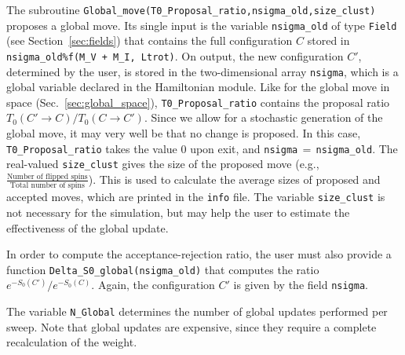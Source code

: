 The subroutine  \texttt{Global\_move(T0\_Proposal\_ratio,nsigma\_old,size\_clust)}  proposes  a global move. 
Its single input is the variable \texttt{nsigma\_old} of type \texttt{Field} (see Section~\ref{sec:fields}) that contains  the full  configuration $C$ stored in \texttt{nsigma\_old\%f(M\_V + M\_I, Ltrot)}.  On output, the new configuration $C'$, determined by the user,  is stored in the two-dimensional array \texttt{nsigma}, which is a global variable declared in the Hamiltonian module.
Like for the global move in space (Sec.~\ref{sec:global_space}), \texttt{T0\_Proposal\_ratio} contains the proposal ratio $T_0(C' \rightarrow C) / T_0(C \rightarrow C') $.
Since we allow for a stochastic  generation of  the global move, it may very well be that no change is proposed. In this case, \texttt{T0\_Proposal\_ratio}   takes the value 0 upon exit, and  \texttt{nsigma$\,=\,$nsigma\_old}.   
The real-valued \texttt{size\_clust} gives the size of the proposed move (e.g., $\tfrac{\text{Number of flipped spins}}{\text{Total number of spins}}$). This is used to calculate the average sizes of proposed and accepted moves, which are printed in the \texttt{info} file. The variable \texttt{size\_clust} is not necessary for the simulation, but may help the user to estimate the effectiveness of the global update.

In order to compute the acceptance-rejection ratio,  the user must also provide a function 
\texttt{Delta\_\-S0}\texttt{\_\-global(nsigma\_old)} that computes the ratio $e^{-S_0(C')}/e^{-S_0(C)}$. Again, the configuration $C'$ is given by the field \texttt{nsigma}.

The variable \texttt{N\_Global} determines the number of global updates performed per sweep. Note that global updates are expensive, since they require a complete recalculation of the weight.
% 

